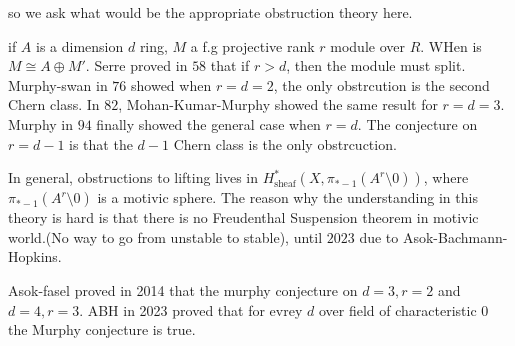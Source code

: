 \documentclass{article}
\theoremstyle{definition}
\theoremstyle{definition}
\theoremstyle{definition}
\theoremstyle{definition}
\theoremstyle{definition}
\theoremstyle{definition}
\theoremstyle{definition}
\begin{document}
so we ask what would be the appropriate obstruction theory here. 

if $A$ is a dimension $d$ ring, $M$ a f.g projective rank $r$ module over $R$. WHen is $M\cong A\oplus M'$. Serre proved in $58$ that if $r>d$, then the module must split. Murphy-swan in $76$ showed when $r=d=2$, the only obstrcution is the second Chern class. In $82$, Mohan-Kumar-Murphy showed the same result for $r=d=3$. Murphy in $94$ finally showed the general case when $r=d$. The conjecture on $r=d-1$ is that the $d-1$ Chern class is the only obstrcuction. 


In general, obstructions to lifting lives in $H_{\textrm{sheaf}}^*(X,\pi_{*-1}(A^r\setminus 0))$, where $\pi_{*-1}(A^r\setminus 0)$ is a motivic sphere. The reason why the understanding in this theory is hard is that there is no Freudenthal Suspension theorem in motivic world.(No way to go from unstable to stable), until $2023$ due to Asok-Bachmann-Hopkins. 

Asok-fasel proved in 2014 that the murphy conjecture on $d=3,r=2$ and $d=4,r=3$. ABH in 2023 proved that for evrey $d$ over field of characteristic $0$ the Murphy conjecture is true. 
\end{document}
